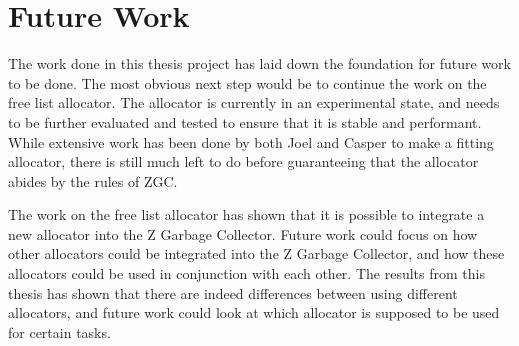 

\section{Future Work}
\label{sec:future_work}
The work done in this thesis project has laid down the foundation for future work to be done. The most obvious next step would be to continue the work on the free list allocator. The allocator is currently in an experimental state, and needs to be further evaluated and tested to ensure that it is stable and performant. While extensive work has been done by both Joel and Casper to make a fitting allocator, there is still much left to do before guaranteeing that the allocator abides by the rules of ZGC.

The work on the free list allocator has shown that it is possible to integrate a new allocator into the Z Garbage Collector. Future work could focus on how other allocators could be integrated into the Z Garbage Collector, and how these allocators could be used in conjunction with each other. The results from this thesis has shown that there are indeed differences between using different allocators, and future work could look at which allocator is supposed to be used for certain tasks.

